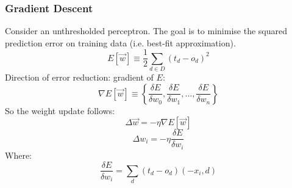 \documentclass[11pt]{article}
\begin{document}
\subsubsection{Gradient Descent}
\label{sec:orgcf6c67c}
Consider an unthresholded perceptron.
The goal is to minimise the squared prediction error on training data (i.e. best-fit approximation).
\begin{equation}
E[\overrightarrow{w}] \equiv \frac{1}{2} \sum\limits_{d\in D} (t_d - o_d)^2
\end{equation}
Direction of error reduction: gradient of \(E\):
\begin{equation}
\nabla E[\overrightarrow{w}] \equiv \left\{ \frac{{\delta}E}{{\delta}w_0},\frac{{\delta}E}{{\delta}w_1}, \ldots, \frac{{\delta}E}{{\delta}w_n} \right \}
\end{equation}
So the weight update follows:
\begin{equation}
{\Delta}\overrightarrow{w} = -\eta \nabla E[\overrightarrow{w}]
\end{equation}
\begin{equation}
{\Delta}w_i = -\eta\frac{{\delta}E}{{\delta}w_i} 
\end{equation}
Where:
\begin{equation}
\frac{{\delta}E}{{\delta}w_i} = \sum\limits_d(t_d - o_d)(-x_i, d)
\end{equation}
\end{document}
